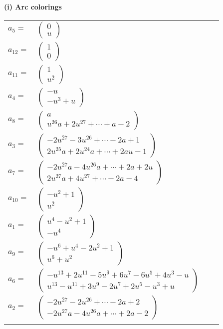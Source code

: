 \documentclass[1p]{elsarticle_modified}
\theoremstyle{definition}
\begin{document}
\flushleft \textbf{(i) Arc colorings}\\
\begin{tabular}{m{7pt} m{180pt} m{7pt} m{180pt} }
\flushright $a_{5}=$&$\begin{pmatrix}0\\u\end{pmatrix}$ \\
\flushright $a_{12}=$&$\begin{pmatrix}1\\0\end{pmatrix}$ \\
\flushright $a_{11}=$&$\begin{pmatrix}1\\u^2\end{pmatrix}$ \\
\flushright $a_{4}=$&$\begin{pmatrix}- u\\- u^3+u\end{pmatrix}$ \\
\flushright $a_{8}=$&$\begin{pmatrix}a\\u^{26} a+2 u^{27}+\cdots+a-2\end{pmatrix}$ \\
\flushright $a_{3}=$&$\begin{pmatrix}-2 u^{27}-3 u^{26}+\cdots-2 a+1\\2 u^{25} a+2 u^{24} a+\cdots+2 a u-1\end{pmatrix}$ \\
\flushright $a_{7}=$&$\begin{pmatrix}-2 u^{27} a-4 u^{26} a+\cdots+2 a+2 u\\2 u^{27} a+4 u^{27}+\cdots+2 a-4\end{pmatrix}$ \\
\flushright $a_{10}=$&$\begin{pmatrix}- u^2+1\\u^2\end{pmatrix}$ \\
\flushright $a_{1}=$&$\begin{pmatrix}u^4- u^2+1\\- u^4\end{pmatrix}$ \\
\flushright $a_{9}=$&$\begin{pmatrix}- u^6+u^4-2 u^2+1\\u^6+u^2\end{pmatrix}$ \\
\flushright $a_{6}=$&$\begin{pmatrix}- u^{13}+2 u^{11}-5 u^9+6 u^7-6 u^5+4 u^3- u\\u^{13}- u^{11}+3 u^9-2 u^7+2 u^5- u^3+u\end{pmatrix}$ \\
\flushright $a_{2}=$&$\begin{pmatrix}-2 u^{27}-2 u^{26}+\cdots-2 a+2\\-2 u^{27} a-4 u^{26} a+\cdots+2 a-2\end{pmatrix}$\\&\end{tabular}
\end{document}
